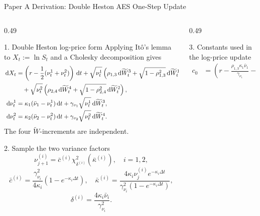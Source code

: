 \begin{frame}{Paper A Derivation: Double Heston AES One-Step Update}
  \vspace{-0.2em}
  \begin{columns}[T,onlytextwidth]
    \begin{column}{0.49\textwidth}
      \begin{block}{1. Double Heston log-price form}
        {\fontsize{4.0}{4.45}\selectfont
        \setlength{\abovedisplayskip}{1pt}
        \setlength{\belowdisplayskip}{1pt}
        Applying It\^{o}'s lemma to \(X_t:=\ln S_t\) and a Cholesky
        decomposition gives
        \[
        \resizebox{0.74\linewidth}{!}{$
        \begin{aligned}
        \dd X_t&=\left(r-\frac12(\nu_t^1+\nu_t^2)\right)\dd t
        +\sqrt{\nu_t^1}\left(\rho_{1,3}\dd\widetilde W_t^3
        +\sqrt{1-\rho_{1,3}^2}\dd\widetilde W_t^1\right)\\
        &\quad+\sqrt{\nu_t^2}\left(\rho_{2,4}\dd\widetilde W_t^4
        +\sqrt{1-\rho_{2,4}^2}\dd\widetilde W_t^2\right),\\[-0.15em]
        \dd\nu_t^1&=\kappa_1(\bar\nu_1-\nu_t^1)\dd t+
        \gamma_{v_1}\sqrt{\nu_t^1}\dd\widetilde W_t^3,\\[-0.15em]
        \dd\nu_t^2&=\kappa_2(\bar\nu_2-\nu_t^2)\dd t+
        \gamma_{v_2}\sqrt{\nu_t^2}\dd\widetilde W_t^4 .
        \end{aligned}
        $}
        \]
        The four \(\widetilde W\)-increments are independent.}
      \end{block}
      \begin{block}{2. Sample the two variance factors}
        {\tiny
        \[
        \nu_{j+1}^{(i)}=\bar c^{(i)}\chi^2_{\delta^{(i)}}\!\left(\bar\kappa^{(i)}\right),\quad i=1,2,
        \]
        \[
        \bar c^{(i)}=\frac{\gamma_{\nu_i}^2}{4\kappa_i}(1-e^{-\kappa_i\Delta t}),\quad
        \bar\kappa^{(i)}=\frac{4\kappa_i\nu_j^{(i)}e^{-\kappa_i\Delta t}}{\gamma_{\nu_i}^2(1-e^{-\kappa_i\Delta t})},
        \]
        \[
        \delta^{(i)}=\frac{4\kappa_i\bar\nu_i}{\gamma_{\nu_i}^2}.
        \]}
      \end{block}
    \end{column}
    \begin{column}{0.49\textwidth}
      \begin{block}{3. Constants used in the log-price update}
        {\tiny
        \[
        \begin{aligned}
        c_0&=\left(r-\frac{\rho_{1,3}\kappa_1\bar\nu_1}{\gamma_{\nu_1}}-\frac{\rho_{2,4}\kappa_2\bar\nu_2}{\gamma_{\nu_2}}\right)\Delta t,\\

\end{aligned}\]}
\end{block}
\end{column}
\end{columns}
\end{frame}
